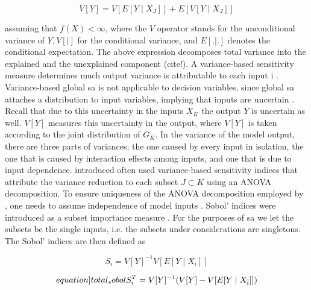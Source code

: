 \begin{equation}
V[Y]= V[E[Y \mid X_J]] + E[V[Y \mid X_J]]
\end{equation}

assuming that $f(X) < \infty$, where the $V$ operator stands for the unconditional variance of $Y, V[|]$ for the conditional variance, and $E[.|.]$ denotes the conditional expectation. The above expression decomposes total variance into the explained and the unexplained component (cite!).
A variance-based sensitivity measure determines much output variance is attributable to each input i \cite{BP16}. Variance-based global sa is not applicable to decision variables, since global sa attaches a distribution to input variables, implying that inputs are uncertain \cite{SNS16}. Recall that due to this uncertainty in the inputs $X_K$ the output $Y$ is uncertain as well. $V[Y]$ measures this uncertainty in the output, where $V[Y]$ is taken according to the joint distribution of $G_K$. In the variance of the model output, there are three parts of variances; the one caused by every input in isolation, the one that is caused by interaction effects among inputs, and one that is due to input dependence.
\cite{S53} introduced often used variance-based sensitivity indices that attribute the variance reduction to each subset $J \subset K$ using an ANOVA decomposition. To ensure uniqueness of the ANOVA decomposition employed by \cite{S53}, one needs to assume independence of model inputs \cite{GM17}. Sobol’ indices were introduced as a subset importance measure \cite{SNS16}. For the purposes of sa we let the subsets be the single inputs, i.e. the subsets under considerations are singletons. The Sobol’ indices are then defined as

\begin{equation}
S_i = V[Y]^{-1} V[E[Y \mid X_i]]
\end{equation}

\begin{equation} \label[equation]{total_sobol}
S_i^T = V[Y]^{-1}(V[Y] - V[E[Y \mid {X_{\tilde i}}]])
\end{equation}

